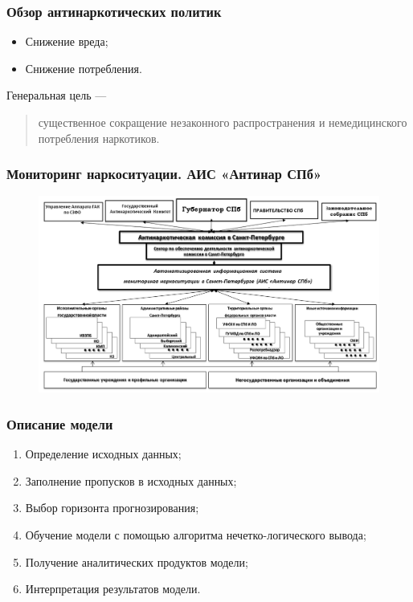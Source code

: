 \documentclass[t]{beamer}  %
\begin{document}
\begin{frame}
    \frametitle{Обзор антинаркотических политик}%
	\begin{itemize}
        \item Снижение вреда;
        \item Снижение потребления.
	\end{itemize}
    Генеральная цель ---
    \begin{quote}
        существенное сокращение незаконного распространения и немедицинского 
        потребления наркотиков. 
    \end{quote}
\end{frame}
\begin{frame}
    \frametitle{Мониторинг наркоситуации. АИС «Антинар СПб»}%
    \begin{figure}
        \centering
        \includegraphics[width=\textwidth]{org_mezhved_antinar.png}
    \end{figure}
\end{frame}
\begin{frame}
    \frametitle{Описание модели} 
    \begin{enumerate}
        \item Определение исходных данных;
        \item Заполнение пропусков в исходных данных;
        \item Выбор горизонта прогнозирования;
        \item Обучение модели с помощью алгоритма нечетко-логического вывода;
        \item Получение аналитических продуктов модели;
        \item Интерпретация результатов модели.
    \end{enumerate}
\end{frame}
\end{document}
